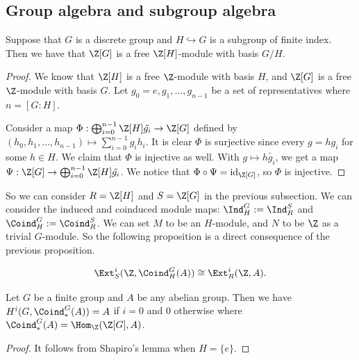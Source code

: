 \subsection{Group algebra and subgroup algebra}

\begin{lemma}
    Suppose that $G$ is a discrete group and $H\hookrightarrow G$ is a subgroup of finite index.
    Then we have that $\Z[G]$ is a free $\Z[H]$-module with basis $G/H$.
\end{lemma}
\begin{proof}
    We know that $\Z[H]$ is a free $\Z$-module with basis $H$,
    and $\Z[G]$ is a free $\Z$-module with basis $G$.
    Let $g_0 = e, g_1, \ldots, g_{n-1}$ be a set of representatives where $n = [G:H]$.

    Consider a map $\Phi: \bigoplus_{i=0}^{n-1} \Z[H]\tilde{g_i} \to \Z[G]$ defined by $(h_0, h_1, \ldots, h_{n-1}) \mapsto \sum_{i=0}^{n-1} g_i h_i$.
    It is clear $\Phi$ is surjective since every $g = hg_i$ for some $h \in H$.
    We claim that $\Phi$ is injective as well.
    With $g \mapsto h \tilde{g_i}$, we get a map $\Psi: \Z[G] \to \bigoplus_{i=0}^{n-1} \Z[H]\tilde{g_i}$.
    We notice that $\Phi \circ \Psi = \mathrm{id}_{\Z[G]}$, so $\Phi$ is injective.
\end{proof}

So we can consider $R = \Z[H]$ and $S = \Z[G]$ in the previous subsection.
We can consider the induced and coinduced module maps: $\Ind_H^G:=\Ind_R^S$ and $\Coind_H^G:=\Coind_R^S$.
We can set $M$ to be an $H$-module, and $N$ to be $\Z$ as a trivial $G$-module.
So the following proposition is a direct consequence of the previous proposition.

\begin{proposition}
    $$\Ext_S^i(\Z, \Coind^G_H(A)) \cong \Ext_R^i(\Z, A).$$
\end{proposition}

\begin{corollary}
    Let $G$ be a finite group and $A$ be any abelian group.
    Then we have $H^i(G, \Coind^G_*(A)) = A$ if $i = 0$ and $0$ otherwise
    where $\Coind^G_*(A) = \Hom_\Z(\Z[G], A)$.
\end{corollary}
\begin{proof}
    It follows from Shapiro's lemma when $H = \{e\}$.
\end{proof}

